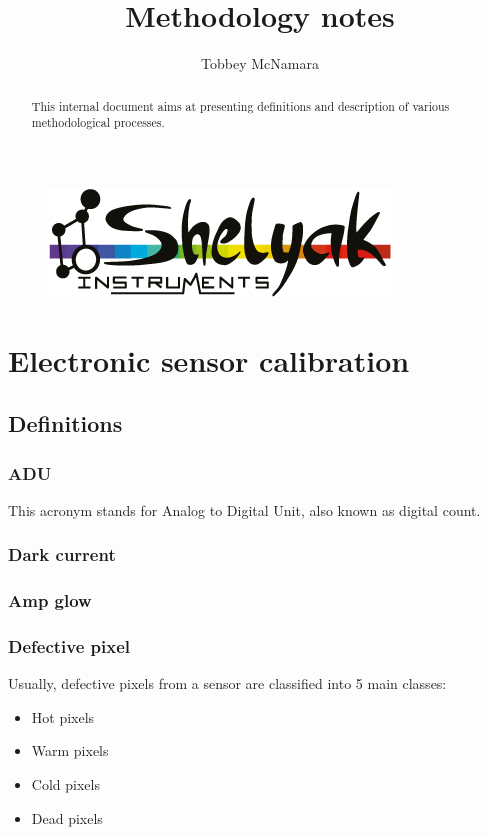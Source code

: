 \documentclass{article}
\title{Methodology notes} %
\author{Tobbey McNamara} %
\begin{document}
\maketitle %
\begin{figure}[H]
\centering
  \includegraphics[scale=1]{../../figures/shelyak-transparent.png}\\ %
\end{figure}


\begin{abstract}
This internal document aims at presenting definitions and description of various methodological processes.
\end{abstract}


\section{Electronic sensor calibration}
  \subsection{Definitions}
    \subsubsection{ADU}
    This acronym stands for Analog to Digital Unit, also known as digital count.
    \subsubsection{Dark current}
    \subsubsection{Amp glow}
    \subsubsection{Defective pixel}
    Usually, defective pixels from a sensor are classified into 5 main classes:
    \begin{itemize}
     \item Hot pixels
     \item Warm pixels
     \item Cold pixels
     \item Dead pixels
    \end{itemize}
    
\end{document}
